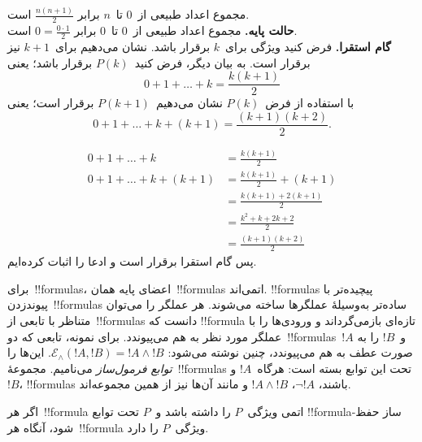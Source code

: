 \documentclass[../../../include/open-logic-section]{subfiles}
\begin{document}
\begin{ex} مجموع اعداد طبیعی از~$0$ تا~$n$ برابر
$\frac{n(n+1)}{2}$ است. \\

\textbf{حالت پایه.} مجموع اعداد طبیعی از~$0$ تا~$0$ برابر
$0=\frac{0\cdot 1}{2}$ است.\\

\textbf{گام استقرا.} فرض کنید ویژگی برای~$k$ برقرار باشد. نشان می‌دهیم
برای~$k+1$ نیز برقرار است. به بیان دیگر، فرض کنید~$P(k)$ برقرار باشد؛
یعنی
\[ 0 + 1 + \ldots + k = \frac{k(k+1)}{2} \]
با استفاده از فرض~$P(k)$ نشان می‌دهیم~$P(k+1)$ برقرار است؛ یعنی
\[ 0 + 1 + \ldots + k + (k+1) = \frac{(k+1)(k+2)}{2}. \]

\begin{align*}
0 + 1 + \ldots + k &= \frac{k(k+1)}{2} \tag{فرض} \\
0 + 1 + \ldots + k + (k+1) &= \frac{k(k+1)}{2} + (k+1)
\tag{افزودن $k+1$ به دو طرف} \\
&= \frac{k(k+1) + 2(k+1)}{2} \\
&= \frac{k^2 + k + 2k +2}{2} \\
&=\frac{(k+1)(k+2)}{2}
\end{align*}
پس گام استقرا برقرار است و ادعا را اثبات کرده‌ایم.
\end{ex}

\begin{explain}
برای~!!{formula}s، اعضای پایه همان~!!{formula}s اتمی‌اند. !!{formula}s
پیچیده‌تر با پیوندزدن~!!{formula}s ساده‌تر به‌وسیلهٔ عملگرها ساخته
می‌شوند. هر عملگر را می‌توان متناظر با تابعی از~!!{formula}s دانست که
!!{formula} تازه‌ای بازمی‌گرداند و ورودی‌ها را با عملگر مورد نظر به هم
می‌پیوندد. برای نمونه، تابعی که دو~!!{formula}s~$!A$ و~$!B$ را به صورت
عطف به هم می‌پیوندد، چنین نوشته می‌شود:
$\mathcal E _\land (!A, !B) = !A \land !B$. این‌ها را
\emph{توابع فرمول‌ساز} می‌نامیم. مجموعهٔ~!!{formula}s تحت این توابع بسته
است: هرگاه~$!A$ و~$!B$، !!{formula}s باشند، $\lnot !A$،
$!A \land !B$ و مانند آن‌ها نیز از همین مجموعه‌اند.
\end{explain}

\begin{defn}
اگر هر~!!{formula} اتمی ویژگی~$P$ را داشته باشد و~$P$ تحت توابع
!!{formula}-ساز حفظ شود، آنگاه هر~!!{formula} ویژگی~$P$ را دارد.
\end{defn}
\end{document}
